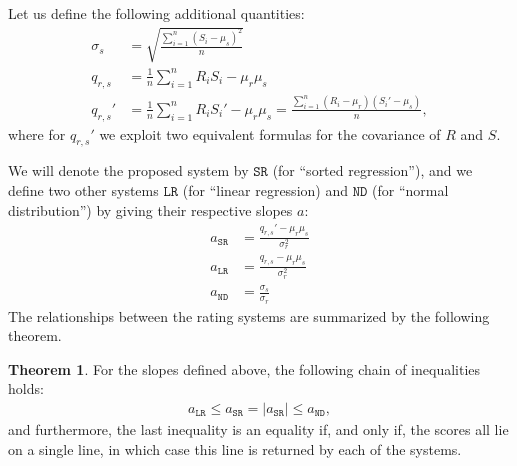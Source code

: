 \documentclass{article}
\newcommand{\artg}{\mu_r}
\newcommand{\ascr}{\mu_s}
\newcommand{\vrtg}{\sigma_r}
\newcommand{\vscr}{\sigma_s}
\newcommand{\cov}{q_{r,s}}
\newcommand{\SR}{\texttt{SR}}
\newcommand{\LR}{\texttt{LR}}
\newcommand{\ND}{\texttt{ND}}
\theoremstyle{definition}
\newtheorem{theorem}{Theorem}
\begin{document}
\noindent
Let us define the following additional quantities:
\begin{align*}
\vscr&=\sqrt{\frac{\sum_{i=1}^n (S_i - \ascr)^2}{n}}\\
\cov&=\frac{1}{n}\sum_{i=1}^n R_iS_i -\artg\ascr\\
\cov'&=\frac{1}{n}\sum_{i=1}^n R_iS_i' -\artg\ascr=\frac{\sum_{i=1}^n (R_i - \artg)(S_i' - \ascr)}{n},
\end{align*}
where for $\cov'$ we exploit two equivalent formulas for the covariance of $R$ and $S$.

We will denote the proposed system by $\SR$ (for ``sorted regression''), and we define two other systems $\LR$ (for ``linear regression) and $\ND$ (for ``normal distribution'') by giving their respective slopes $a$:
\begin{align}
a_\SR&=\frac{\cov'-\artg\ascr}{\vrtg^2}\\
a_\LR&=\frac{\cov-\artg\ascr}{\vrtg^2}\\
a_\ND&=\frac{\vscr}{\vrtg}
\end{align}
The relationships between the rating systems are summarized by the following theorem.
\begin{theorem}\label{thm:chain} For the slopes defined above, the following chain of inequalities holds:
\begin{align}\label{eq:thm}
a_\LR\leq a_\SR=|a_\SR|\leq a_\ND,
\end{align}
and furthermore, the last inequality is an equality if, and only if, the scores all lie on a single line, in which case this line is returned by each of the systems.
\end{theorem}
\end{document}
